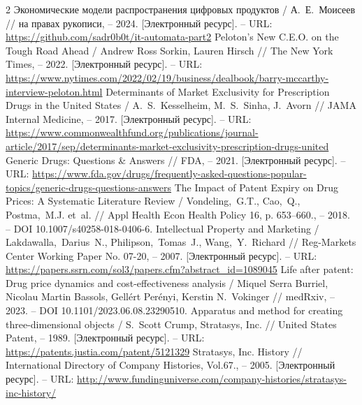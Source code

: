 \documentclass{article}
\begin{document}
\begin{thebibliography}{2}
 Экономические модели распространения цифровых продуктов / А.~Е.~Моисеев // на правах рукописи, – 2024. [Электронный ресурс]. – URL: \url{https://github.com/sadr0b0t/it-automata-part2}
 Peloton’s New C.E.O. on the Tough Road Ahead / Andrew Ross Sorkin, Lauren Hirsch // The New York Times, – 2022. [Электронный ресурс]. – URL: \url{https://www.nytimes.com/2022/02/19/business/dealbook/barry-mccarthy-interview-peloton.html}
 Determinants of Market Exclusivity for Prescription Drugs in the United States / A.~S.~Kesselheim, M.~S.~Sinha, J.~Avorn // JAMA Internal Medicine, – 2017. [Электронный ресурс]. – URL: \url{https://www.commonwealthfund.org/publications/journal-article/2017/sep/determinants-market-exclusivity-prescription-drugs-united}
 Generic Drugs: Questions \& Answers // FDA, – 2021. [Электронный ресурс]. – URL: \url{https://www.fda.gov/drugs/frequently-asked-questions-popular-topics/generic-drugs-questions-answers}
 The Impact of Patent Expiry on Drug Prices: A Systematic Literature Review / Vondeling,~G.T., Cao,~Q., Postma,~M.J. et~al. // Appl Health Econ Health Policy 16, p. 653–660., – 2018. – DOI 10.1007/s40258-018-0406-6.
 Intellectual Property and Marketing / Lakdawalla,~Darius~N., Philipson,~Tomas~J., Wang,~Y.~Richard // Reg-Markets Center Working Paper No. 07-20, – 2007. [Электронный ресурс]. – URL: \url{https://papers.ssrn.com/sol3/papers.cfm?abstract_id=1089045}
 Life after patent: Drug price dynamics and cost-effectiveness analysis / Miquel Serra Burriel, Nicolau Martin Bassols, Gellért Perényi, Kerstin N.~Vokinger // medRxiv, – 2023. – DOI 10.1101/2023.06.08.23290510.
 Apparatus and method for creating three-dimensional objects / S.~Scott Crump, Stratasys, Inc. // United States Patent, – 1989. [Электронный ресурс]. – URL: \url{https://patents.justia.com/patent/5121329}
 Stratasys, Inc. History // International Directory of Company Histories, Vol.67., – 2005. [Электронный ресурс]. – URL: \url{http://www.fundinguniverse.com/company-histories/stratasys-inc-history/}

\end{thebibliography}
\end{document}
